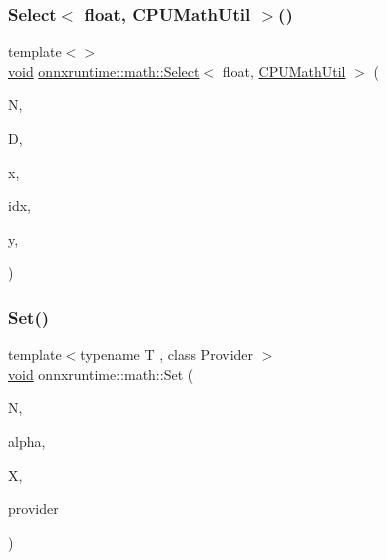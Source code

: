 \subsubsection{\texorpdfstring{Select$<$ float, C\+P\+U\+Math\+Util $>$()}{Select< float, CPUMathUtil >()}}
{\footnotesize\ttfamily template$<$$>$ \\
\mbox{\hyperlink{mlasi_8h_a88f941d423cb2a819b70a1358982b1a6}{void}} \mbox{\hyperlink{namespaceonnxruntime_1_1math_a942b4be2e0b3bcd1582319fa45f0121c}{onnxruntime\+::math\+::\+Select}}$<$ float, \mbox{\hyperlink{classonnxruntime_1_1CPUMathUtil}{C\+P\+U\+Math\+Util}} $>$ (\begin{DoxyParamCaption}\item[{const int}]{N,  }\item[{const int}]{D,  }\item[{const float $\ast$}]{x,  }\item[{const int $\ast$}]{idx,  }\item[{float $\ast$}]{y,  }\item[{\mbox{\hyperlink{classonnxruntime_1_1CPUMathUtil}{C\+P\+U\+Math\+Util}} $\ast$}]{ }\end{DoxyParamCaption})}

\mbox{\label{namespaceonnxruntime_1_1math_a4b2f70ba41071f010f519fa8f1aca70b}} 
\subsubsection{\texorpdfstring{Set()}{Set()}}
{\footnotesize\ttfamily template$<$typename T , class Provider $>$ \\
\mbox{\hyperlink{mlasi_8h_a88f941d423cb2a819b70a1358982b1a6}{void}} onnxruntime\+::math\+::\+Set (\begin{DoxyParamCaption}\item[{const int64\+\_\+t}]{N,  }\item[{const T}]{alpha,  }\item[{T $\ast$}]{X,  }\item[{Provider $\ast$}]{provider }\end{DoxyParamCaption})}

\mbox{\label{namespaceonnxruntime_1_1math_a0ad494b8508b830475ad78be7a089f27}} 
